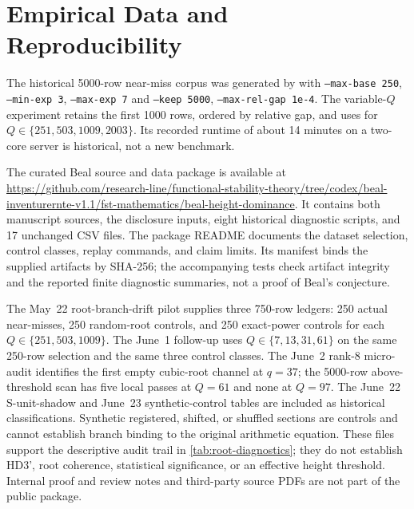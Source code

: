 \documentclass[11pt,a4paper]{article}
\begin{document}
\appendix

\section{Empirical Data and Reproducibility}
\label{app:data}

The historical 5000-row near-miss corpus was generated by
 with
\texttt{--max-base 250}, \texttt{--min-exp 3}, \texttt{--max-exp 7} and
\texttt{--keep 5000}, \texttt{--max-rel-gap 1e-4}. The variable-$Q$ experiment
retains the first 1000 rows, ordered by relative gap, and uses
 for
$Q\in\{251,503,1009,2003\}$. Its recorded runtime of about 14 minutes
on a two-core server is historical, not a new benchmark.

The curated Beal source and data package is available at
\url{https://github.com/research-line/functional-stability-theory/tree/codex/beal-inventurernte-v1.1/fst-mathematics/beal-height-dominance}.
It contains both manuscript sources, the disclosure inputs, eight
historical diagnostic scripts, and 17 unchanged CSV files. The package
README documents the dataset selection, control classes, replay commands,
and claim limits. Its manifest binds the supplied artifacts by SHA-256;
the accompanying tests check artifact integrity and the reported finite
diagnostic summaries, not a proof of Beal's conjecture.

The May~22 root-branch-drift pilot supplies three 750-row ledgers:
250 actual near-misses, 250 random-root controls, and 250 exact-power
controls for each $Q\in\{251,503,1009\}$. The June~1 follow-up uses
$Q\in\{7,13,31,61\}$ on the same 250-row selection and the same three
control classes. The June~2 rank-8 micro-audit identifies the first
empty cubic-root channel at $q=37$; the 5000-row above-threshold scan
has five local passes at $Q=61$ and none at $Q=97$.
The June~22 S-unit-shadow and June~23 synthetic-control tables are
included as historical classifications. Synthetic registered, shifted,
or shuffled sections are controls and cannot establish branch binding
to the original arithmetic equation.
These files support the descriptive audit trail in
\cref{tab:root-diagnostics}; they do not establish HD3', root coherence,
statistical significance, or an effective height threshold. Internal
proof and review notes and third-party source PDFs are not part of
the public package.


\end{document}
